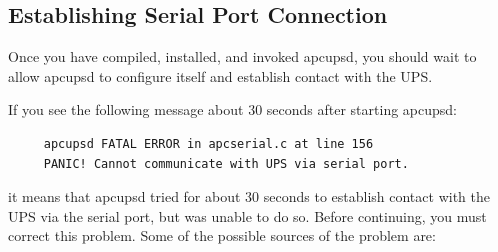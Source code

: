 {{{{{{{{{\label{Establishing-Serial-Port-Connection}

\subsection*{Establishing Serial Port Connection}

\label{index-Testing_002c-Serial-221}
Once you have compiled, installed, and invoked apcupsd, you should wait to
allow apcupsd to configure itself and establish contact with the UPS.  

If you see the following message about 30 seconds after starting apcupsd: 

\footnotesize
\begin{verbatim}
     apcupsd FATAL ERROR in apcserial.c at line 156
     PANIC! Cannot communicate with UPS via serial port.
\end{verbatim}
\normalsize

it means that apcupsd tried for about 30 seconds to establish contact with the
UPS via the serial port, but was unable to do so. Before continuing, you must
correct this problem. Some of the possible sources of the problem are:  

}}}}}}}}}
